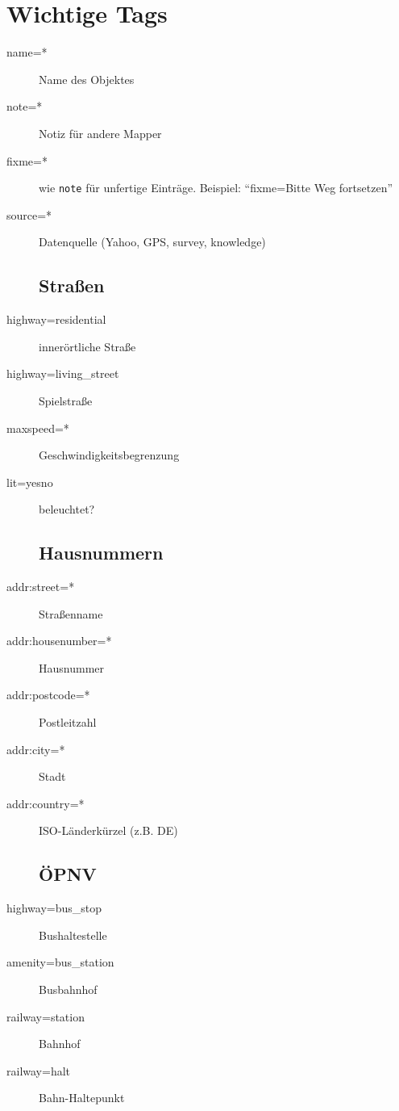 \documentclass[a4paper,11pt,notumble]{leaflet}
\begin{document}
\section*{Wichtige Tags}
\begin{flushleft}
\begin{description}
\item[name=*] Name des Objektes
\item[note=*] Notiz für andere Mapper
\item[fixme=*] wie \texttt{note} für unfertige Einträge. 
Beispiel: "`fixme=Bitte Weg fortsetzen"'
\item[source=*] Datenquelle (Yahoo, GPS, survey, knowledge)
\subsection*{Straßen}
\item[highway=residential] innerörtliche Straße
\item[highway=living\_street] Spielstraße
\item[maxspeed=*] Geschwindigkeitsbegrenzung 
\item[lit=yes\textbar no] beleuchtet?
\subsection*{Hausnummern}
\item[addr:street=*] Straßenname
\item[addr:housenumber=*] Hausnummer 
\item[addr:postcode=*] Postleitzahl
\item[addr:city=*] Stadt
\item[addr:country=*] ISO-Länderkürzel (z.B. DE)
\subsection*{ÖPNV}
\item[highway=bus\_stop] Bushaltestelle
\item[amenity=bus\_station] Busbahnhof
\item[railway=station] Bahnhof
\item[railway=halt] Bahn-Haltepunkt

\end{description}
\end{flushleft}
\end{document}
